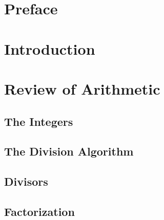 \documentclass{memoir}
\begin{document}
\frontmatter%
  
    \clearpage

  
    \newpage

  \cleardoublepage
  \setcounter{page}{1}

  \begin{KeepFromToc}
    \tableofcontents%
  \end{KeepFromToc}

  \chapter{Preface}
    

  \chapter{Introduction}
    


\mainmatter
  \setcounter{chapter}{-1}

  \chapter{Review of Arithmetic}
    \label{chap:arithmetic}
    
    \newpage

    \section{The Integers}
      \label{sec:the-integers}
      
      \newpage

    \section{The Division Algorithm}
      \label{sec:div-alg}
      
      \newpage

    \section{Divisors}
      \label{sec:int-div}
      
      \newpage

    \section{Factorization}
      \label{sec:int-factor}
      
      \newpage
\end{document}

